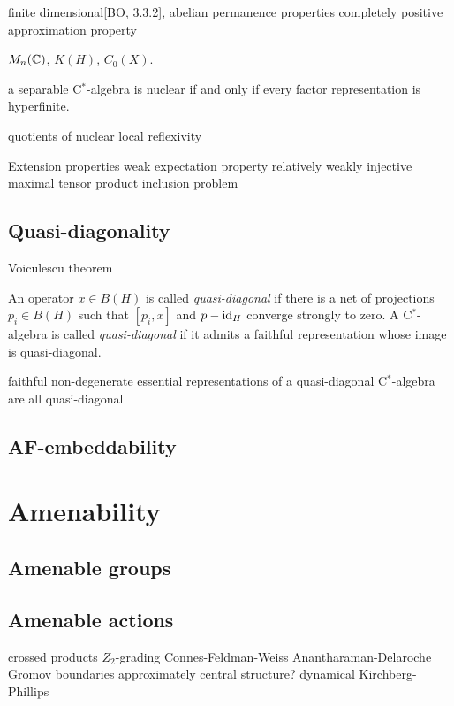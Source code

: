 \documentclass{../../large}
\begin{document}
finite dimensional[BO, 3.3.2], abelian
permanence properties
completely positive approximation property

$M_n(\mathbb{C})$, $K(H)$, $C_0(X)$.

a separable C$^*$-algebra is nuclear if and only if every factor representation is hyperfinite.



quotients of nuclear
local reflexivity



Extension properties
weak expectation property
relatively weakly injective
maximal tensor product inclusion problem


\section{Quasi-diagonality}
Voiculescu theorem


\begin{prb}
An operator $x\in B(H)$ is called \emph{quasi-diagonal} if there is a net of projections $p_i\in B(H)$ such that $[p_i,x]$ and $p-\operatorname{id}_H$ converge strongly to zero.
A C$^*$-algebra is called \emph{quasi-diagonal} if it admits a faithful representation whose image is quasi-diagonal.
\end{prb}

faithful non-degenerate essential representations of a quasi-diagonal C$^*$-algebra are all quasi-diagonal

\section{AF-embeddability}






\chapter{Amenability}


\section{Amenable groups}


\section{Amenable actions}
crossed products
$Z_2$-grading
Connes-Feldman-Weiss
Anantharaman-Delaroche
Gromov boundaries
approximately central structure?
dynamical Kirchberg-Phillips
\end{document}
